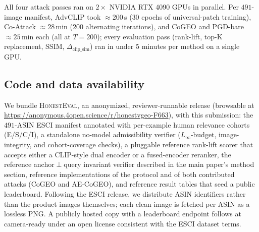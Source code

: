 All four attack passes ran on $2 \times$ NVIDIA RTX 4090 GPUs in parallel. Per $491$-image manifest, AdvCLIP took $\approx 200$\,s ($30$ epochs of universal-patch training), Co-Attack $\approx 28$\,min ($200$ alternating iterations), and CoGEO and PGD-bare $\approx 25$\,min each (all at $T=200$); every evaluation pass (rank-lift, top-K replacement, SSIM, $\Delta_{\mathrm{clip\_sim}}$) ran in under $5$ minutes per method on a single GPU.

\subsection{Code and data availability}

We bundle \textsc{HonestEval}, an anonymized, reviewer-runnable release (browsable at \url{https://anonymous.4open.science/r/honestvgeo-F663}), with this submission: the $491$-ASIN ESCI manifest annotated with per-example human relevance cohorts (E/S/C/I), a standalone no-model admissibility verifier ($L_\infty$-budget, image-integrity, and cohort-coverage checks), a pluggable reference rank-lift scorer that accepts either a CLIP-style dual encoder or a fused-encoder reranker, the reference anchor$\perp$query invariant verifier described in the main paper's method section, reference implementations of the protocol and of both contributed attacks (CoGEO and AE-CoGEO), and reference result tables that seed a public leaderboard. Following the ESCI release, we distribute ASIN identifiers rather than the product images themselves; each clean image is fetched per ASIN as a lossless PNG. A publicly hosted copy with a leaderboard endpoint follows at camera-ready under an open license consistent with the ESCI dataset terms.
